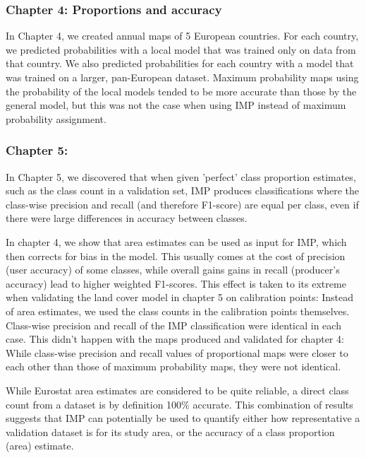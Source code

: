         \subsubsection{Chapter 4: Proportions and accuracy}
        
        In Chapter 4, we created annual maps of 5 European countries. For each country, we predicted probabilities with a local model that was trained only on data from that country. We also predicted probabilities for each country with a model that was trained on a larger, pan-European dataset. Maximum probability maps using the probability of the local models tended to be more accurate than those by the general model, but this was not the case when using IMP instead of maximum probability assignment.

        \subsubsection{Chapter 5:  }
        
        In Chapter 5, we discovered that when given 'perfect' class proportion estimates, such as the class count in a validation set, IMP produces classifications where the class-wise precision and recall (and therefore F1-score) are equal per class, even if there were large differences in accuracy between classes.
        

        In chapter 4, we show that area estimates can be used as input for IMP, which then corrects for bias in the model. This usually comes at the cost of precision (user accuracy) of some classes, while overall gains gains in recall (producer's accuracy) lead to higher weighted F1-scores. This effect is taken to its extreme when validating the land cover model in chapter 5 on calibration points: Instead of area estimates, we used the class counts in the calibration points themselves. Class-wise precision and recall of the IMP classification were identical in each case. This didn't happen with the maps produced and validated for chapter 4: While class-wise precision and recall values of proportional maps were closer to each other than those of maximum probability maps, they were not identical.
    
        While Eurostat area estimates are considered to be quite reliable, a direct class count from a dataset is by definition 100\% accurate. This combination of results suggests that IMP can potentially be used to quantify either how representative a validation dataset is for its study area, or the accuracy of a class proportion (area) estimate. 

